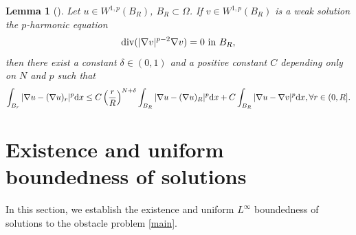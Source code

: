 \documentclass[onecolumn]{autart}
\newtheorem{lemma}{Lemma}
\begin{document}
\begin{lemma}[{\cite[Lemma 4.1]{Leitao:2015}}] \label{lem3}
	Let $u \in W^{1,p}(B_R)$, $B_R \subset \Omega$. If $v \in W^{1,p}(B_R)$ is a weak solution the $p$-harmonic equation
	\begin{align}
		\mathrm{div} (|\nabla v|^{p-2}\nabla v) = 0 \text{ in } B_R,\notag
	\end{align}
	then there exist a constant $\delta \in (0, 1)$ and a positive constant $C$ depending only on $N$ and $p$ such that
	\begin{align}
		\int_{B_r} |\nabla u - (\nabla u)_r|^p \mathrm{d}x \leq C \left( \frac{r}{R} \right)^{N+\delta} \int_{B_R} |\nabla u - (\nabla u)_R|^p \mathrm{d}x + C \int_{B_R} |\nabla u - \nabla v|^p \mathrm{d}x,\forall r \in (0, R]. \notag
	\end{align}
	
\end{lemma}
%




\section{Existence  and uniform boundedness  of solutions}\label{Sec.3}

In this section, we   establish the existence   and uniform $L^\infty$ boundedness of solutions  to the  obstacle problem \eqref{main}.
\end{document}
